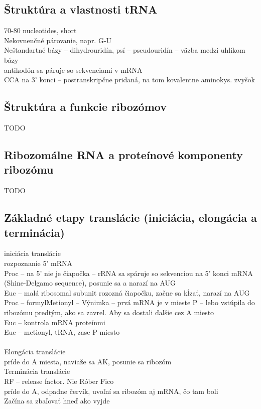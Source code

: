 \subsection{Štruktúra a vlastnosti tRNA}
70-80 nucleotides, short\\
Nekovnenčné párovanie, napr. G-U\\
Neštandartné bázy -- dihydrouridín, psí -- pseudouridín -- väzba medzi uhlíkom bázy\\
antikodón sa páruje so sekvenciami v mRNA\\
CCA na 3' konci -- postranskripčne pridaná, na tom kovalentne aminokys. zvyšok\\
\subsection{Štruktúra a funkcie ribozómov}
TODO
\subsection{Ribozomálne RNA a proteínové komponenty ribozómu}
TODO
\subsection{Základné etapy translácie (iniciácia, elongácia a terminácia)}
iniciácia translácie \\
\tab rozpoznanie 5' mRNA\\
\tab Proc -- na 5' nie je čiapočka -- rRNA sa spáruje so sekvenciou na 5' konci mRNA (Shine-Delgamo sequence), posunie sa a narazí na AUG \\
\tab Euc -- malá ribosomal subunit rozozná čiapočku, začne sa kĺzať, narazí na AUG \\
\tab Proc -- formylMetionyl -- Výnimka -- prvá mRNA je v mieste P -- lebo vstúpila do ribozómu predtým, ako sa zavrel. Aby sa dostali ďalšie cez A miesto\\
\tab Euc -- kontrola mRNA proteínmi\\
\tab Euc -- metionyl, tRNA, zase P miesto\\
\tab \\
Elongácia translácie\\
\tab príde do A miesta, naviaže sa AK, posunie sa ribozóm\\
Terminácia translácie\\
\tab RF -- release factor. Nie Róber Fico\\
\tab príde do A, odpadne červík, uvoľní sa ribozóm aj mRNA, čo tam boli\\
Začína sa zbaľovať hneď ako vyjde\\
